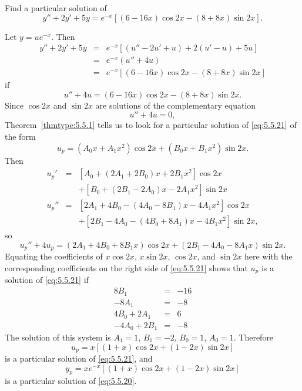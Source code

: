 \documentclass{ximera}
\begin{document}
\begin{example}\label{example:5.5.6}
Find a particular solution of
\begin{equation} \label{eq:5.5.20}
y''+2y'+5y=e^{-x}\left[(6-16x)\cos2x-(8+8x)\sin2x\right].
\end{equation}
 
 
\begin{explanation}
Let $y=ue^{-x}$. Then
\begin{eqnarray*}
y''+2y'+5y&=&e^{-x}\left[(u''-2u'+u)+2(u'-u)+5u\right]\\
&=&e^{-x}(u''+4u)\\ &=&
e^{-x}\left[(6-16x)\cos2x-(8+8x)\sin2x\right]
\end{eqnarray*}
if
\begin{equation} \label{eq:5.5.21}
u''+4u=(6-16x)\cos2x-(8+8x)\sin2x.
\end{equation}
Since $\cos2x$  and $\sin2x$ are solutions of
the complementary equation
$$
u''+4u=0,
$$
 Theorem~\ref{thmtype:5.5.1} tells us to look for a particular solution
of \eqref{eq:5.5.21} of the form
$$
u_p=(A_0x+A_1x^2)\cos2x+(B_0x+B_1x^2)\sin2x.
$$
Then
\begin{eqnarray*}
u_p'&=&\left[A_0+(2A_1+2B_0)x+2B_1x^2\right]\cos2x \\ &&
+\left[B_0+(2B_1-2A_0)x-2A_1x^2\right]\sin2x\\
u_p''&=&\left[2A_1+4B_0-(4A_0-8B_1)x-4A_1x^2\right]\cos2x\\ &&
+\left[2B_1-4A_0-(4B_0+8A_1)x-4B_1x^2\right]\sin2x,
\end{eqnarray*}
so
$$
u_p''+4u_p=(2A_1+4B_0+8B_1x)\cos2x+(2B_1-4A_0-8A_1x)\sin2x.
$$
Equating the  coefficients of $x\cos2x$,
$x\sin2x$, $\cos2x$, and $\sin2x$  here with the
corresponding
coefficients on the right side of \eqref{eq:5.5.21} shows that $u_p$
is a solution of \eqref{eq:5.5.21} if
\begin{equation} \label{eq:5.5.22}
\begin{array}{rcr}
8B_1&=&-16\\
-8A_1&=&-8\\
4B_0+2A_1&=&6\\
-4A_0+2B_1&=&-8
\end{array}
\end{equation}
The solution of this system is  $A_1=1$, $B_1=-2$, $B_0=1$, $A_0=1$.
Therefore
$$
u_p=x[(1+x)\cos2x+(1-2x)\sin2x]
$$
is a particular solution of  \eqref{eq:5.5.21}, and
$$
y_p=xe^{-x}\left[(1+x)\cos2x+(1-2x)\sin2x\right]
$$
is a particular solution of  \eqref{eq:5.5.20}.
\end{explanation}
\end{example}
 
\end{document}
